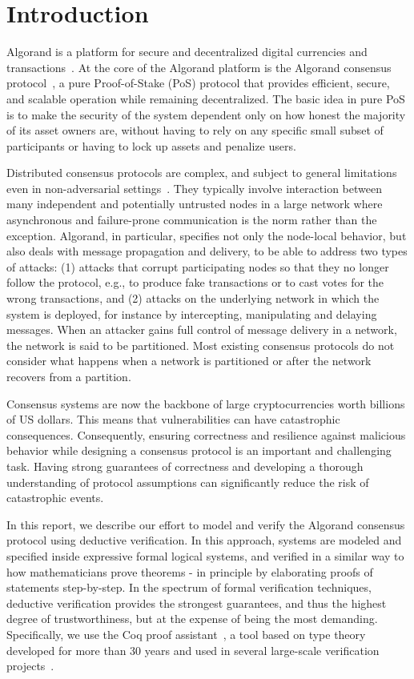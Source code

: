\section{Introduction}

Algorand is a platform for secure and decentralized digital currencies and transactions~\cite{Micali2019}. At the core of the Algorand platform is the Algorand consensus protocol~\cite{Chen2018,Chen2019}, a pure Proof-of-Stake (PoS) protocol that provides efficient, secure, and scalable operation while remaining decentralized. The basic idea in pure PoS is to make the security of the system dependent only on how honest the majority of its asset owners are, without having to rely on any specific small subset of participants or having to lock up assets and penalize users.

Distributed consensus protocols are complex, and subject to general limitations even in non-adversarial settings~\cite{Fischer1985}. They typically involve interaction between many independent and potentially untrusted nodes in a large network where asynchronous and failure-prone communication is the norm rather than the exception.
Algorand, in particular, specifies not only the node-local behavior, but also deals with message propagation and delivery, to be able to address two types of attacks: (1) attacks that corrupt participating nodes so that they no longer follow the protocol, e.g., to produce fake transactions or to cast votes for the wrong transactions, and (2) attacks on the underlying network in which the system is deployed, for instance by intercepting, manipulating and delaying messages. When an attacker gains full control of message delivery in a network, the network is said to be partitioned. Most existing consensus protocols do not consider what happens when a network is partitioned or after the network recovers from a partition.

Consensus systems are now the backbone of large cryptocurrencies worth billions of US dollars. This means that vulnerabilities can have catastrophic consequences. Consequently, ensuring correctness and resilience against malicious behavior while designing a consensus protocol is an important and challenging task. Having strong guarantees of correctness and developing a thorough understanding of protocol assumptions can significantly reduce the risk of catastrophic events.

In this report, we describe our effort to model and verify the Algorand consensus protocol using deductive verification. In this approach, systems are modeled and specified inside expressive formal logical systems, and verified in a similar way to how mathematicians prove theorems - in principle by elaborating proofs of statements step-by-step. In the spectrum of formal verification techniques, deductive verification provides the strongest guarantees, and thus the highest degree of trustworthiness, but at the expense of being the most demanding. Specifically, we use the Coq proof assistant~\cite{CoqArt}, a tool based on type theory developed for more than 30 years and used in several large-scale verification projects~\cite{Leroy2009,Woos2016}.

